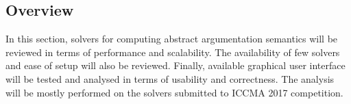 \subsection{Overview}
In this section, solvers for computing abstract argumentation semantics will be reviewed in terms of performance and scalability. The availability of few solvers and ease of setup will also be reviewed. Finally, available graphical user interface will be tested and analysed in terms of usability and correctness. The analysis will be mostly performed on the solvers submitted to ICCMA 2017 competition.